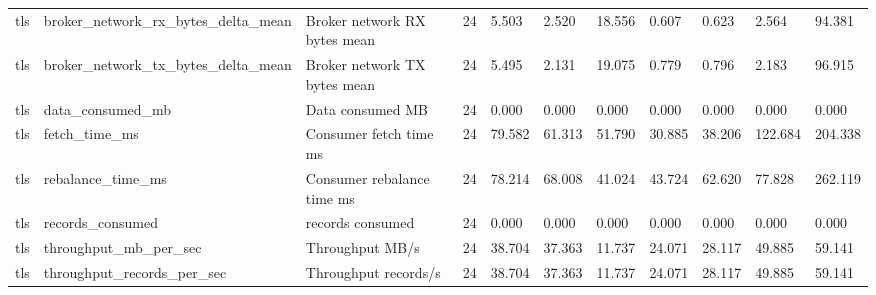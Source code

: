 \begin{tabular}{lllllllllll}
tls & broker\_network\_rx\_bytes\_delta\_mean & Broker network RX bytes mean & 24 & 5.503 & 2.520 & 18.556 & 0.607 & 0.623 & 2.564 & 94.381 \\
tls & broker\_network\_tx\_bytes\_delta\_mean & Broker network TX bytes mean & 24 & 5.495 & 2.131 & 19.075 & 0.779 & 0.796 & 2.183 & 96.915 \\
tls & data\_consumed\_mb & Data consumed MB & 24 & 0.000 & 0.000 & 0.000 & 0.000 & 0.000 & 0.000 & 0.000 \\
tls & fetch\_time\_ms & Consumer fetch time ms & 24 & 79.582 & 61.313 & 51.790 & 30.885 & 38.206 & 122.684 & 204.338 \\
tls & rebalance\_time\_ms & Consumer rebalance time ms & 24 & 78.214 & 68.008 & 41.024 & 43.724 & 62.620 & 77.828 & 262.119 \\
tls & records\_consumed & records consumed & 24 & 0.000 & 0.000 & 0.000 & 0.000 & 0.000 & 0.000 & 0.000 \\
tls & throughput\_mb\_per\_sec & Throughput MB/s & 24 & 38.704 & 37.363 & 11.737 & 24.071 & 28.117 & 49.885 & 59.141 \\
tls & throughput\_records\_per\_sec & Throughput records/s & 24 & 38.704 & 37.363 & 11.737 & 24.071 & 28.117 & 49.885 & 59.141 \\
\hline
\end{tabular}

